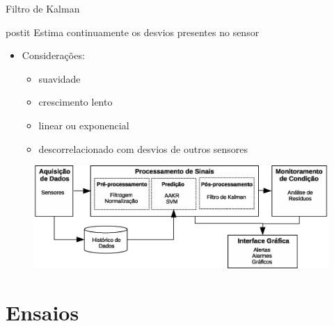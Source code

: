 \documentclass{beamer}
\begin{document}
\begin{frame}{Filtro de Kalman}

    \begin{beamercolorbox}[sep=5pt]{postit}
        Estima continuamente os desvios presentes no sensor
    \end{beamercolorbox}

    \begin{itemize}
        \item Considerações:
            \begin{itemize}
                \item suavidade
                \item crescimento lento
                \item linear ou exponencial
                \item descorrelacionado com desvios de outros sensores
            \end{itemize}
    \end{itemize}

    \begin{figure}[!htb]
        \centering
        \includegraphics[width=\textwidth]{figuras/osa_cbm_drift.eps}
    \end{figure}
    
\end{frame}

\section{Ensaios}
\end{document}
